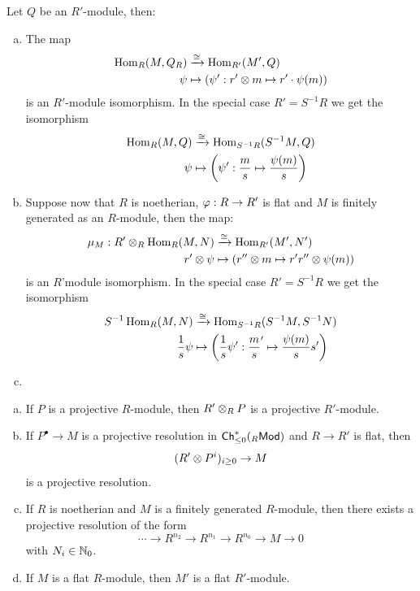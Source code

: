 \documentclass[a4paper]{report}
\begin{document}
\begin{prop}
  Let $Q$ be an $R'$-module, then:
  \begin{enumerate}[(a)]
\item The map \begin{align*}
  \operatorname{Hom}_{R}(M,Q_{R}) &\xrightarrow \cong \operatorname{Hom}_{R'}(M',Q) \\
  \psi &\mapsto (\psi': r' \otimes m \mapsto r' \cdot \psi(m))
\end{align*}
          is an $R'$-module isomorphism. In the special case $R' = S^{-1}R$ we get the isomorphism
          \begin{align*}
            \operatorname{Hom}_{R}(M,Q) &\xrightarrow \cong \operatorname{Hom}_{S^{-1}R}(S^{-1}M,Q) \\
            \psi &\mapsto \left(\psi': \frac ms \mapsto \frac{\psi(m)}s\right)
          \end{align*}
    \item Suppose now that $R$ is noetherian, $\varphi: R \to R'$ is flat and $M$ is finitely generated as an $R$-module, then the map:
          \begin{align*}
            \mu_{M}: R' \otimes_{R} \operatorname{Hom}_{R}(M,N) &\xrightarrow \cong \operatorname{Hom}_{R'}(M',N') \\
            r' \otimes \psi &\mapsto (r'' \otimes m \mapsto r'r'' \otimes \psi(m))
          \end{align*}
          is an $R$'module isomorphism. In the special case $R' = S^{-1}R$ we get the isomorphism
          \begin{align*}
            S^{-1}\operatorname{Hom}_{R}(M,N) &\xrightarrow \cong \operatorname{Hom}_{S^{-1}R}(S^{-1}M,S^{-1}N) \\
            \frac 1s \psi &\mapsto \left(\frac 1s \psi': \frac ms' \mapsto \frac{\psi(m)}ss'\right)
          \end{align*}
          \item
  \end{enumerate}
\end{prop}

\begin{lemm}
  \begin{enumerate}[(a)]
    \item If $P$ is a projective $R$-module, then $R' \otimes_{R} P$ is a projective $R'$-module.
    \item If $P^{\bullet} \to M$ is a projective resolution in $\mathsf{Ch}^*_{\le 0}({}_R\mathsf{Mod})$ and $R \to R'$ is flat, then \[(R' \otimes P^{i})_{i \ge 0} \to M\]
          is a projective resolution.
    \item If $R$ is noetherian and $M$ is a finitely generated $R$-module, then there exists a projective resolution of the form \[\cdots \to R^{n_{2}} \to R^{n_{1}} \to R^{n_{0}} \to M \to 0\]with $N_{i} \in \mathbb{N}_0$.
          \item If $M$ is a flat $R$-module, then $M'$ is a flat $R'$-module.
  \end{enumerate}

\end{lemm}
\end{document}
